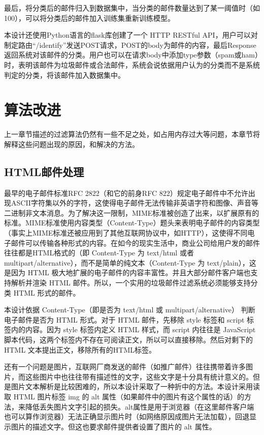 \documentclass[UTF8,zihao=-4]{ctexart}
\begin{document}
	最后，将分类后的邮件归入到数据集中，当分类的邮件数量达到了某一阈值时（如100），可以将分类后的邮件加入训练集重新训练模型。
	
	本设计还使用Python语言的flask库创建了一个 HTTP RESTful API，用户可以对制定路由“/identify”发送POST请求，POST的body为邮件的内容，最后Response返回系统对该邮件的分类。用户也可以在请求body中添加type参数（spam或ham）时，表明该邮件为垃圾邮件或合法邮件，系统会说依据用户认为的分类而不是系统判定的分类，将该邮件加入数据集中。

\newpage
\section{算法改进}
	上一章节描述的过滤算法仍然有一些不足之处，如占用内存过大等问题，本章节将解释这些问题出现的原因，和解决的方法。
\subsection{HTML邮件处理}
	最早的电子邮件标准RFC 2822（和它的前身RFC 822）规定电子邮件中不允许出现ASCII字符集以外的字符，这使得电子邮件无法传输非英语字符和图像、声音等二进制非文本消息。为了解决这一限制，MIME标准被创造了出来，以扩展原有的标准。MIME标准使用内容类型（Content-Type）题头来表明电子邮件的内容类型（事实上MIME标准还被应用到了其他互联网协议中，如HTTP），这使得不同电子邮件可以传输各种形式的内容。在如今的现实生活中，商业公司给用户发的邮件往往都是HTML格式的（即 Content-Type 为 text/html 或者 multipart/alternative），而不是简单的纯文本（Content-Type 为 text/plain），这是因为 HTML 极大地扩展的电子邮件的内容丰富性。并且大部分邮件客户端也支持解析并渲染 HTML 邮件。所以，一个实用的垃圾邮件过滤系统必须能够支持分类 HTML 形式的邮件。
	
	本设计依据 Content-Type（即是否为 text/html 或 multipart/alternative） 判断电子邮件是否为 HTML 形式。对于 HTML 邮件，先移除 style 标签和 script 标签内的内容。因为 style 标签内定义 HTML 样式，而 script 内往往是 JavaScript 脚本代码，这两个标签内不存在可阅读正文，所以可以直接移除。然后对剩下的 HTML 文本提出正文，移除所有的HTML标签。
	
	还有一个问题是图片，互联网厂商发送的邮件（如推广邮件）往往携带着许多图片，而这些图片中也往往带有描述性的文字，这些文字是十分具有统计意义的。但是图片文本解析是比较困难的，所以本设计采取了一种折中的方法。本设计采用读取 HTML 图片标签 img 的 alt 属性（如果邮件中的图片有这个属性的话）的方法，来降低丢失图片文字引起的损失。alt属性是用于浏览器（在这里邮件客户端也可以算作浏览器）无法正确显示图片时（如网络原因成图片无法加载），回退显示图片的描述文字。但这也要求邮件提供者设置了图片的 alt 属性。
\end{document}
